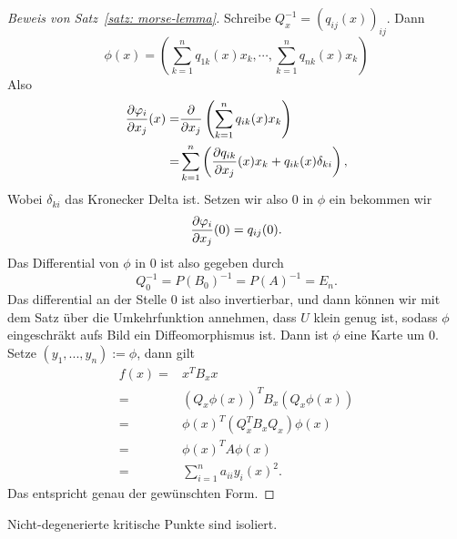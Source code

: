 \begin{proof}[Beweis von Satz~\ref{satz: morse-lemma}]
    Schreibe $Q_x^{-1} = (q_{ij}(x))_{ij}$. Dann
    \[ \phi(x) = \left( 
        \sum_{k = 1}^n q_{1k}(x) x_k, \cdots , \sum_{k = 1}^n q_{nk}(x) x_k
        \right)
    \]
    Also 
    \begin{align*}
        \pderive[\phi_i]{x_j} (x) 
            = & \pderive{x_j} \left( \sum_{k = 1}^n q_{ik} (x) x_k \right) \\
        = & \sum_{k = 1}^n \left( 
            \pderive[q_{ik}]{x_j}(x) x_k + q_{ik}(x) \delta_{ki}
        \right)
    , \end{align*}
    Wobei $\delta_{ki}$ das Kronecker Delta ist. Setzen wir also $0$  in $\phi$ ein
    bekommen wir
    \[ \pderive[\phi_i]{x_j}(0) = q_{ij}(0). \]
    Das Differential von $\phi$ in $0$ ist also gegeben durch
    \[ Q_0^{-1} = P(B_0)^{-1} = P(A)^{-1} = E_n . \]
    Das differential an der Stelle $0$ ist also invertierbar, und dann können wir mit dem 
    Satz über die Umkehrfunktion annehmen, dass $U$ klein genug ist, sodass $\phi$ 
    eingeschräkt aufs Bild ein Diffeomorphismus ist. 
    Dann ist $\phi$ eine Karte um $0$. Setze $(y_1, ..., y_n) := \phi$, dann gilt 
    \begin{align*}
        f(x) = & x^T B_x x \\
        = & (Q_x \phi(x))^T B_x (Q_x \phi(x)) \\
        = & \phi(x)^T (Q_x^T B_x Q_x) \phi(x) \\
        = & \phi(x)^T A \phi(x) \\
        = & \sum_{i = 1}^n a_{ii} y_i(x)^2
    . \end{align*}
    Das entspricht genau der gewünschten Form.
\end{proof}

\begin{corollary}
    Nicht-degenerierte kritische Punkte sind isoliert.
\end{corollary}
